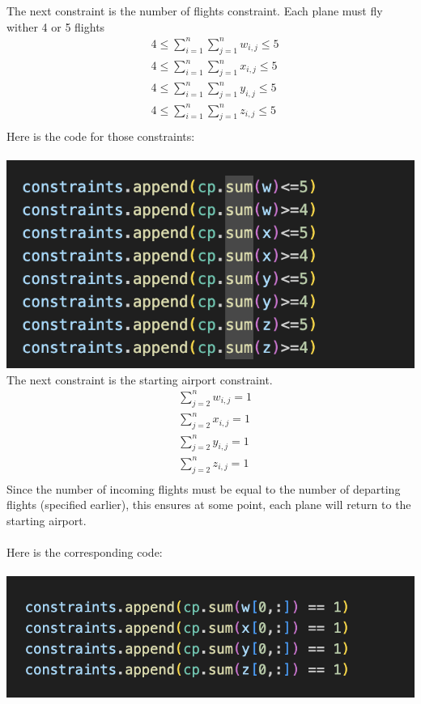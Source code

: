\documentclass[12pt]{extarticle}
\begin{document}
The next constraint is the number of flights constraint. Each plane must fly wither 4 or 5 flights
\begin{align*}
&4 \leq\sum_{i=1}^n\sum_{j=1}^nw_{i,j} \leq 5 \\
&4 \leq\sum_{i=1}^n\sum_{j=1}^nx_{i,j} \leq 5 \\
&4 \leq\sum_{i=1}^n\sum_{j=1}^ny_{i,j} \leq 5 \\
&4 \leq\sum_{i=1}^n\sum_{j=1}^nz_{i,j} \leq 5 \\
\end{align*}
Here is the code for those constraints: \\ \\
\includegraphics{images/constraints4.png} \\

The next constraint is the starting airport constraint.
\begin{align*}
&\sum_{j=2}^nw_{i,j} = 1 \\
&\sum_{j=2}^nx_{i,j} = 1 \\
&\sum_{j=2}^ny_{i,j} = 1 \\
&\sum_{j=2}^nz_{i,j} = 1 \\
\end{align*}
Since the number of incoming flights must be equal to the number of departing flights (specified earlier), this ensures at some point, each plane will return to the starting airport. \\ \\
Here is the corresponding code:\\ \\
\includegraphics{images/constraints5.png} \\
\end{document}
